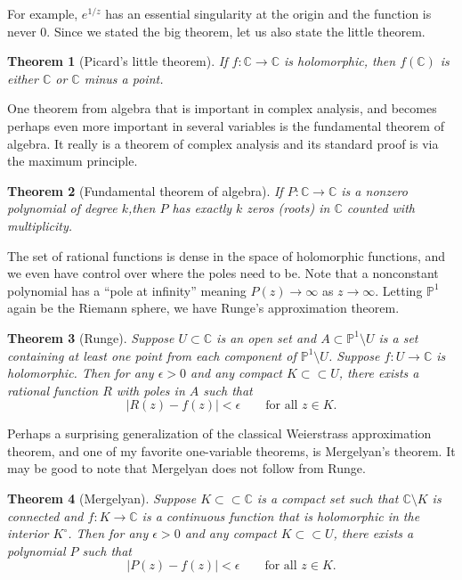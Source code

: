 \documentclass[12pt,openany]{book}
\newcommand{\sabs}[1]{\lvert {#1} \rvert}
\newcommand{\C}{{\mathbb{C}}}
\newcommand{\bP}{{\mathbb{P}}}
\theoremstyle{plain}
\newtheorem{thm}{Theorem}[section]
\theoremstyle{remark}
\theoremstyle{definition}
\theoremstyle{exercise}
\theoremstyle{example}
\begin{document}
For example, $e^{1/z}$ has an essential singularity at the origin
and the function is never 0.
Since we stated the big theorem, let us also state the little theorem.

\begin{thm}[Picard's little theorem]
If $f \colon \C \to \C$ is holomorphic,
then
$f(\C)$ is either $\C$ or $\C$ minus a point.
\end{thm}


One theorem from algebra that is important in complex analysis, and becomes
perhaps even more important in several variables is the fundamental theorem
of algebra.  It really is a theorem of complex analysis and its standard
proof is via the maximum principle.

\begin{thm}[Fundamental theorem of algebra]
\label{thm:fundamentalthmalg}%
If $P \colon \C \to \C$ is a nonzero polynomial of degree $k$,\linebreak[2]
then $P$
has exactly $k$ zeros (roots) in $\C$ counted with multiplicity.
\end{thm}

The set of rational functions is dense in the space of holomorphic
functions, and we even have control over where the poles need to be.
Note that a nonconstant polynomial has a ``pole at infinity'' meaning 
$P(z) \to \infty$ as $z \to \infty$.  Letting $\bP^1$ again be the Riemann
sphere, we have Runge's approximation theorem.

\begin{thm}[Runge]
Suppose $U \subset \C$ is an open set and $A \subset \bP^1 \setminus U$
is a set containing at least one point from each component of
$\bP^1 \setminus U$.  Suppose $f \colon U \to \C$ is holomorphic.
Then for any $\epsilon > 0$ and any compact
$K \subset \subset U$, there exists a rational function $R$ with poles in $A$
such that
\begin{equation*}
\sabs{R(z) - f(z)} < \epsilon \qquad \text{for all $z \in K$}.
\end{equation*}
\end{thm}

Perhaps a surprising generalization of the
classical Weierstrass approximation theorem,
and one of my favorite one-variable theorems,
is Mergelyan's theorem.
It may be good to note that Mergelyan does not follow from Runge.

\begin{thm}[Mergelyan] \label{thm:mergelyan}
Suppose $K \subset \subset \C$ is a compact set such that $\C \setminus K$
is connected and
$f \colon K \to \C$ is a continuous function that is
holomorphic in the interior $K^\circ$.
Then for any $\epsilon > 0$ and any compact
$K \subset \subset U$, there exists a polynomial $P$
such that
\begin{equation*}
\sabs{P(z) - f(z)} < \epsilon \qquad \text{for all $z \in K$}.
\end{equation*}
\end{thm}
\end{document}

